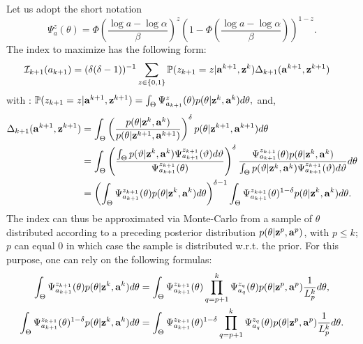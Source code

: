 Let us adopt the short notation
    \begin{equation}
        \Psi^z_a(\theta)=\Phi\left(\frac{\log a-\log\alpha}{\beta}\right)^z\left(1-\Phi\left(\frac{\log a-\log\alpha}{\beta}\right)\right)^{1-z}.
    \end{equation}
The index to maximize has the following form:
    \begin{align}
        \mathcal{I}_{k+1}(a_{k+1})&= (\delta(\delta-1))^{-1}
            \sum_{z\in\{0,1\}}
                \mathbb{P}({z_{k+1}}=z|\mathbf{a}^{k+1},\mathbf{z}^{k})
                \Delta_{k+1}(\mathbf{a}^{k+1},\mathbf{z}^{k+1})
    \end{align}
with :
        $\mathbb{P}({z_{k+1}}=z|\mathbf{a}^{k+1},\mathbf{z}^{k+1}) = \int_{\Theta}\Psi^{z}_{a_{k+1}}(\theta)p(\theta|\mathbf{z}^{k},\mathbf{a}^{k})d\theta,$
and,
    \begin{align}
        \Delta_{k+1}(\mathbf{a}^{k+1},\mathbf{z}^{k+1}) &=
            \int_{\Theta}\left(\frac{p(\theta|\mathbf{z}^{k},\mathbf{a}^{k})}{p(\theta|\mathbf{z}^{k+1},\mathbf{a}^{k+1})}\right)^{\delta}p(\theta|\mathbf{z}^{k+1},\mathbf{a}^{k+1})d\theta \nonumber\\
        &=\int_\Theta \left(\frac{\int_\Theta p(\vartheta|\mathbf{z}^k,\mathbf{a}^k)\Psi^{z_{k+1}}_{a_{k+1}}(\vartheta)d\vartheta}{\Psi^{z_{k+1}}_{a_{k+1}}(\theta) } \right)^\delta \frac{\Psi^{z_{k+1}}_{a_{k+1}}(\theta)p(\theta|\mathbf{z}^k,\mathbf{a}^k) }{\int_\Theta p(\vartheta|\mathbf{z}^k,\mathbf{a}^k)\Psi^{z_{k+1}}_{a_{k+1}}(\vartheta)d\vartheta} d\theta\\
        &= \left(\int_\Theta \Psi^{z_{k+1}}_{a_{k+1}}(\theta) p(\theta| \mathbf{z}^k, \mathbf{a}^k) d\theta\right)^{\delta-1}  \int_\Theta \Psi^{z_{k+1}}_{a_{k+1}}(\theta)^{1-\delta} p(\theta|\mathbf{z}^k,\mathbf{a}^k)  d\theta.\nonumber
    \end{align}
The index can thus be approximated via Monte-Carlo from a sample of $\theta$ distributed according to a preceding posterior distribution $p(\theta|\mathbf{z}^p,\mathbf{a}^p)$, with $p\leq k$; $p$ can equal $0$ in which case the sample is distributed w.r.t. the prior. For this purpose, one can rely on the following formulas:
    \begin{align}
        \int_\Theta\Psi^{z_{k+1}}_{a_{k+1}}(\theta)p(\theta|\mathbf{z}^k,\mathbf{a}^k)d\theta &= \int_\Theta \Psi^{z_{k+1}}_{a_{k+1}}(\theta)\prod_{q=p+1}^k\Psi^{z_{q}}_{a_{q}}(\theta)p(\theta|\mathbf{z}^p,\mathbf{a}^p)\frac{1}{L_p^k}d\theta ,\\
        \int_\Theta\Psi^{z_{k+1}}_{a_{k+1}}(\theta)^{1-\delta}p(\theta|\mathbf{z}^k,\mathbf{a}^k)d\theta &= \int_\Theta \Psi^{z_{k+1}}_{a_{k+1}}(\theta)^{1-\delta}\prod_{q=p+1}^k\Psi^{z_{q}}_{a_{q}}(\theta)p(\theta|\mathbf{z}^p,\mathbf{a}^p)\frac{1}{L^k_p}d\theta.\nonumber
    \end{align}
